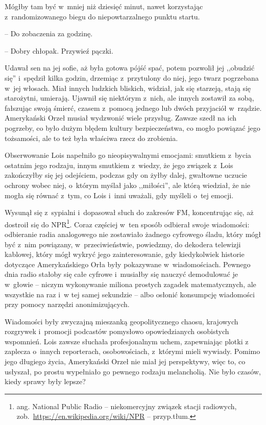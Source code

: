\documentclass[oneside,polish,11pt,sfheadings]{mwbk}
\begin{document}
Mógłby tam być w~mniej niż dziesięć minut, nawet korzystając z~randomizowanego biegu do niepowtarzalnego punktu startu. 

-- Do zobaczenia
za godzinę.

-- Dobry chłopak. Przywieź pączki.

Udawał sen na jej sofie, aż była gotowa pójść spać, potem pozwolił jej
,,obudzić się'' i~spędził kilka godzin, drzemiąc z~przytulony do niej,
jego twarz pogrzebana w~jej włosach. Miał innych ludzkich bliskich,
widział, jak się starzeją, stają się starożytni, umierają. Ujawnił się
niektórym z~nich, ale innych zostawił za sobą, fałszując swoją śmierć,
czasem z~pomocą jednego lub dwóch przyjaciół w~rządzie. Amerykański
Orzeł musiał wydzwonić wiele przysług. Zawsze szedł na ich pogrzeby, co
było dużym błędem kultury bezpieczeństwa, co mogło powiązać jego
tożsamości, ale to też była właściwa rzecz do zrobienia.

Obserwowanie Lois napełniło go nieopisywalnymi emocjami: smutkiem z~bycia ostatnim jego rodzaju, innym smutkiem z~wiedzy, że jego związek z~Lois zakończyłby się jej odejściem, podczas gdy on żyłby dalej,
gwałtowne uczucie ochrony wobec niej, o~którym myślał jako ,,miłości'',
ale którą wiedział, że nie mogła się równać z~tym, co Lois i~inni
uważali, gdy myśleli o~tej emocji.

Wysunął się z~sypialni i~dopasował słuch do zakresów FM, koncentrując
się, aż dostroił się do NPR\footnote{ang. National Public Radio -- niekomercyjny związek stacji radiowych,
zob.~\url{https://en.wikipedia.org/wiki/NPR} -- przyp.tłum.}.
Coraz częściej w~ten sposób odbierał swoje wiadomości: odbieranie radia
analogowego nie zostawiało żadnego cyfrowego śladu, który mógł być z~nim
powiązany, w~przeciwieństwie, powiedzmy, do dekodera telewizji kablowej,
który mógł wykryć jego zainteresowanie, gdy kiedykolwiek historie
dotyczące Amerykańskiego Orła były pokazywane w~wiadomościach. Pewnego
dnia radio stałoby się całe cyfrowe i~musiałby się nauczyć demodulować
je w~głowie -- niczym wykonywanie miliona prostych zagadek
matematycznych, ale wszystkie na raz i~w tej samej sekundzie -- albo
osłonić konsumpcję wiadomości przy pomocy narzędzi anonimizujących.

Wiadomości były zwyczajną mieszanką geopolitycznego chaosu, krajowych
rozgrywek i~promocji podcastów pomysłowo opowiedzianych osobistych
wspomnień. Lois zawsze słuchała profesjonalnym uchem, zapewniając plotki
z zaplecza o~innych reporterach, osobowościach, z~którymi mieli wywiady.
Pomimo jego długiego życia, Amerykański Orzeł nie miał jej perspektywy,
więc to, co usłyszał, po prostu wypełniało go pewnego rodzaju
melancholią. Nie było czasów, kiedy sprawy były lepsze?
\end{document}
